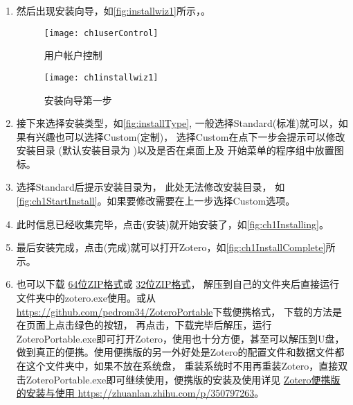 \documentclass[theorem=false,mathfont=none,openany,sub3section]{easybook}
\begin{document}
\begin{enumerate}
  \item 然后出现安装向导，如\autoref{fig:installwiz1}所示，。
        \begin{figure}[htbp]
          \centering
          \begin{minipage}[t]{\dimexpr0.5\textwidth-4em}
            \centering
            \texttt{[image: ch1userControl]}
            \caption{用户帐户控制}
            \label{fig:userControl}
          \end{minipage}
          \hspace{1em}
          \begin{minipage}[t]{\dimexpr0.5\textwidth-4em}
            \centering
            \texttt{[image: ch1installwiz1]}
            \caption{安装向导第一步}
            \label{fig:installwiz1}
          \end{minipage}
        \end{figure}
  \item 接下来选择安装类型，如\autoref{fig:installType},
        一般选择Standard(标准)就可以，如果有兴趣也可以选择Custom(定制)，
        选择Custom在点下一步会提示可以修改安装目录
        (默认安装目录为 )以及是否在桌面上及
        开始菜单的程序组中放置图标。
  \item 选择Standard后提示安装目录为，
        此处无法修改安装目录，
        如\autoref{fig:ch1StartInstall}。如果要修改需要在上一步选择Custom选项。
  \item 此时信息已经收集完毕，点击(安装)就开始安装了，如\autoref{fig:ch1Installing}。
  \item 最后安装完成，点击(完成)就可以打开Zotero，如\autoref{fig:ch1InstallComplete}所示。
  \item 也可以下载
        \href{https://www.zotero.org/download/client/dl?channel=release&platform=win-x64-zip}{64位ZIP格式}或
        \href{https://www.zotero.org/download/client/dl?channel=release&platform=win32-zip}{32位ZIP格式}，
        解压到自己的文件夹后直接运行文件夹中的zotero.exe使用。或从\href{https://github.com/pedrom34/ZoteroPortable}
        {https://github.com/pedrom34/ZoteroPortable}下载便携格式，
        下载的方法是在页面上点击绿色的按钮，
        再点击，下载完毕后解压，运行ZoteroPortable.exe即可打开Zotero，使用也十分方便，甚至可以解压到U盘，
        做到真正的便携。使用便携版的另一外好处是Zotero的配置文件和数据文件都在这个文件夹中，如果不放在系统盘，
        重装系统时不用再重装Zotero，直接双击ZoteroPortable.exe即可继续使用，便携版的安装及使用详见
        \href{https://zhuanlan.zhihu.com/p/350797263}{Zotero便携版的安装与使用
          \url{https://zhuanlan.zhihu.com/p/350797263}}。
\end{enumerate}
\end{document}
